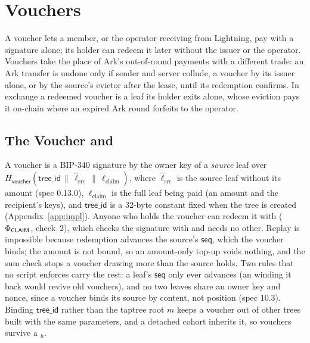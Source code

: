 \section{Vouchers}\label{sec:vouchers}

A voucher lets a member, or the operator receiving from Lightning, pay
with a signature alone; its holder can redeem it later without the
issuer or the operator. Vouchers take the place of Ark's out-of-round
payments with a different trade: an Ark transfer is undone only if
sender and server collude, a voucher by its issuer alone, or by the
source's evictor after the lease, until its redemption confirms. In
exchange a redeemed voucher is a leaf its holder exits alone, whose
eviction pays it on-chain where an expired Ark round forfeits to the
operator.

\subsection{The Voucher and }\label{sec:voucher-def}

A voucher is a BIP-340 signature by the owner key of a \emph{source}
leaf over
$H_{\mathsf{voucher}}(\mathsf{tree\_id} \,\|\, \hat\ell_{\mathrm{src}} \,\|\, \ell_{\mathrm{claim}})$,
where $\hat\ell_{\mathrm{src}}$ is the source leaf without its amount
(spec 0.13.0), $\ell_{\mathrm{claim}}$ is the full leaf being paid (an
amount and the recipient's keys), and $\mathsf{tree\_id}$ is a 32-byte
constant fixed when the tree is created (Appendix~\ref{app:impl}). Anyone
who holds the voucher can redeem it with  ($\Phi_{\textsf{CLAIM}}$,
check~2), which checks the signature with  and needs
no other. Replay is impossible because redemption advances the source's
$\mathsf{seq}$, which the voucher binds; the amount is not bound, so an
amount-only top-up voids nothing, and the sum check stops a voucher
drawing more than the source holds. Two rules that no script enforces
carry the rest: a leaf's $\mathsf{seq}$ only ever advances (an
 winding it back would revive old vouchers), and no two leaves
share an owner key and nonce, since a voucher binds its source by content,
not position (spec 10.3). Binding $\mathsf{tree\_id}$ rather than the
taptree root $m$ keeps a voucher out of other trees built with the same
parameters, and a detached cohort inherits it, so vouchers survive a
$_h$.

